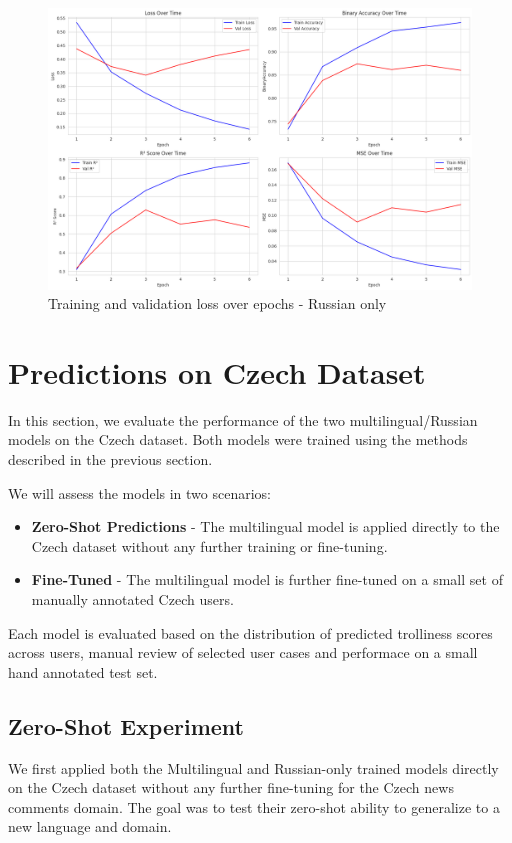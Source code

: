 \documentclass[twoside]{ctuthesis}
\theoremstyle{plain}
\theoremstyle{definition}
\theoremstyle{note}
\begin{document}
\begin{figure}[htbp]
  \centering
  \includegraphics[scale=0.33]{figures/russian_training.png}
  \caption{Training and validation loss over epochs - Russian only}
  \label{fig:training_stats_russian}
\end{figure}

\section{Predictions on Czech Dataset}
In this section, we evaluate the performance of the two multilingual/Russian models on the Czech dataset. Both models were trained using the methods described in the previous section.\par
We will assess the models in two scenarios:
\begin{itemize}
  \item \textbf{Zero-Shot Predictions} - The multilingual model is applied directly to the Czech dataset without any further training or fine-tuning.
  \item \textbf{Fine-Tuned} - The multilingual model is further fine-tuned on a small set of manually annotated Czech users.
\end{itemize}

Each model is evaluated based on the distribution of predicted trolliness scores across users, manual review of selected user cases and performace on a small hand annotated test set.

\subsection{Zero-Shot Experiment}
We first applied both the Multilingual and Russian-only trained models directly on the Czech dataset without any further fine-tuning for the Czech news comments domain. The goal was to test their zero-shot ability to generalize to a new language and domain.\par
\end{document}
